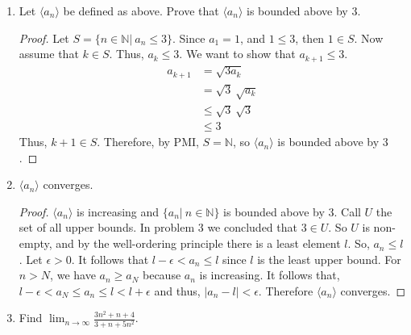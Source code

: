 \documentclass{article}
\theoremstyle{problem}
\theoremstyle{plain}
\theoremstyle{remark}
\newcommand{\abs}[1] {
  \left| #1 \right|
}
\begin{document}
\begin{enumerate}
\item Let $\langle a_n \rangle$ be defined as above. Prove that $\langle a_n \rangle$ is bounded above by 3.
\begin{proof}
  Let $S = \{n \in \mathbb N|\ a_n \leq 3\}$. Since $a_1 = 1$, and $1 \leq 3$, then $1 \in S$. Now assume that $k \in S$. Thus, $a_k \leq 3$. We want to show that $a_{k+1} \leq 3$.
  \begin{align*}
    a_{k+1} &= \sqrt{3a_k}\\
    &= \sqrt{3}\ \sqrt{a_k}\\
    &\leq \sqrt{3}\ \sqrt{3}\\
    &\leq 3
  \end{align*}
Thus, $k+1 \in S$. Therefore, by PMI, $S = \mathbb N$, so $\langle a_n \rangle$ is bounded above by $3$.
\end{proof}
\item $\langle a_n \rangle$ converges.
\begin{proof}
  $\langle a_n \rangle$ is increasing and $\{a_n|\ n \in \mathbb N \}$ is bounded above by 3. Call $U$ the set of all upper bounds. In problem 3 we concluded that $3 \in U$. So $U$ is non-empty, and by the well-ordering principle there is a least element $l$. So, $a_n \leq l$. Let $\epsilon > 0$. It follows that $l - \epsilon < a_n \leq l$ since $l$ is the least upper bound. For $n > N$, we have $a_n \geq a_N$ because $a_n$ is increasing. It follows that, $l - \epsilon < a_N \leq a_n \leq l < l + \epsilon$ and thus, $\abs{a_n - l} < \epsilon$. Therefore $\langle a_n \rangle$ converges.
\end{proof}
\item Find $\displaystyle \lim_{n \to \infty} \frac{3n^2+n+4}{3 + n + 5n^2}$.
\end{enumerate}
\end{document}
